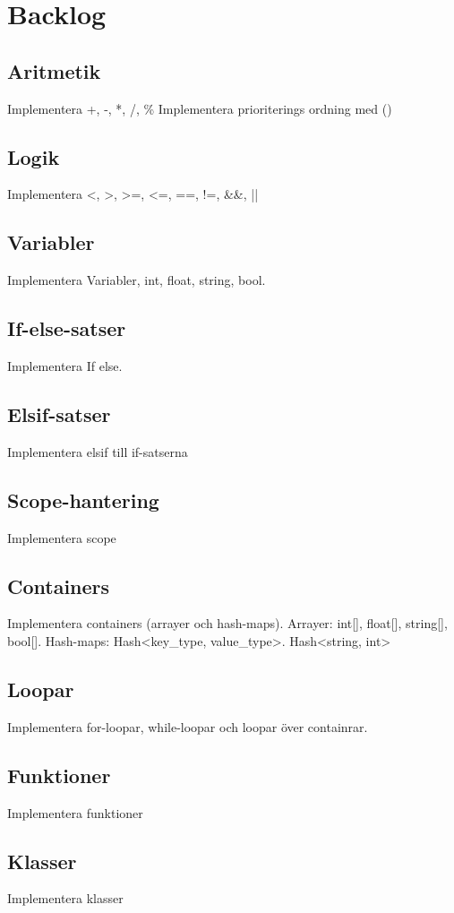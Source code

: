 \documentclass{TDP003mall}
\begin{document}
    \section{Backlog}
    \subsection{Aritmetik}
    Implementera +, -, *, /, \%
    Implementera prioriterings ordning med ()
    \subsection{Logik}
    Implementera <, >, >=, <=, ==, !=, \&\&, ||
    \subsection{Variabler}
    Implementera Variabler, int, float, string, bool.
    \subsection{If-else-satser}
    Implementera If else.
    \subsection{Elsif-satser}
    Implementera elsif till if-satserna
    \subsection{Scope-hantering}
    Implementera scope
    \subsection{Containers}
    Implementera containers (arrayer och hash-maps).
    Arrayer: int[], float[], string[], bool[].
    Hash-maps: Hash<key\_type, value\_type>. Hash<string, int>
    \subsection{Loopar}
    Implementera for-loopar, while-loopar och loopar över containrar.
    \subsection{Funktioner}
    Implementera funktioner
    \subsection{Klasser}
    Implementera klasser
\end{document}
